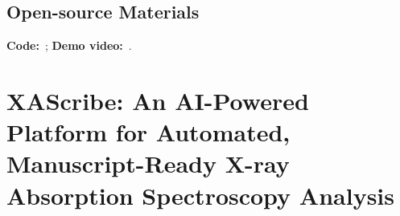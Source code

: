 \subsection*{Open-source Materials}
\textbf{Code:} \,; 
\textbf{Demo video:} \,.








\section{XAScribe: An AI-Powered Platform for Automated, Manuscript-Ready X-ray Absorption Spectroscopy Analysis}



